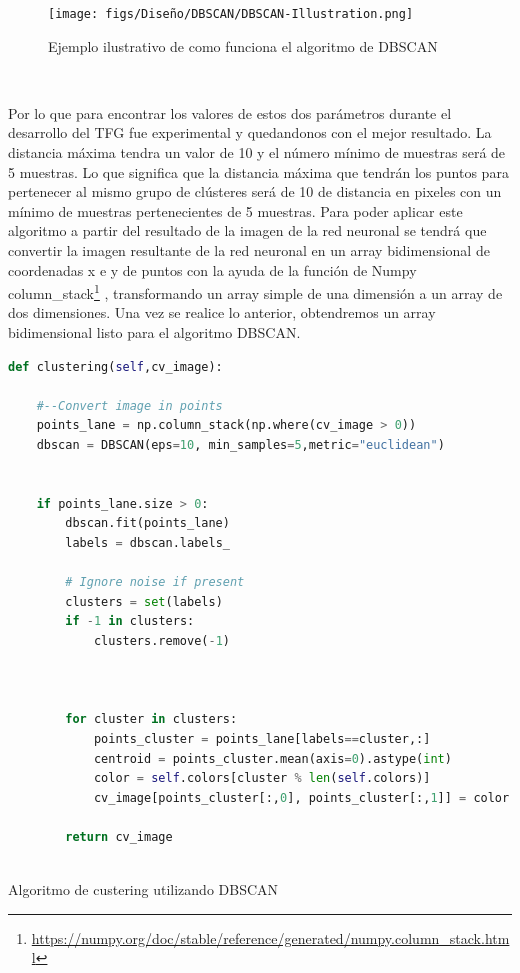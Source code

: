 \begin{figure} [H]
  \begin{center}
    \texttt{[image: figs/Diseño/DBSCAN/DBSCAN-Illustration.png]}
  \end{center}
  \caption{Ejemplo ilustrativo de como funciona el algoritmo de DBSCAN \cite{DBSCAN}}
  \label{fig:Ejemplo_DBSCAN}
\end{figure}\

Por lo que para encontrar los valores de estos dos parámetros durante el desarrollo del TFG fue experimental y quedandonos con el mejor resultado. La distancia máxima tendra un valor de 10 
y el número mínimo de muestras será de 5 muestras. Lo que significa que la distancia máxima que tendrán los puntos para pertenecer al mismo grupo de clústeres será de 10 de distancia en pixeles
con un mínimo de muestras pertenecientes de 5 muestras. Para poder aplicar este algoritmo a partir del resultado de la imagen de la red neuronal se tendrá que convertir la imagen resultante
de la red neuronal en un array bidimensional de coordenadas x e y de puntos con la ayuda de la función de Numpy column\_stack\footnote{\url{https://numpy.org/doc/stable/reference/generated/numpy.column_stack.html}} , 
transformando un array simple de una dimensión a un array de dos dimensiones. Una vez se realice lo anterior, obtendremos un array bidimensional listo para el algoritmo DBSCAN.\newline


\begin{code}[h]
  \begin{lstlisting}[language=Python]
    def clustering(self,cv_image):

    #--Convert image in points
    points_lane = np.column_stack(np.where(cv_image > 0))
    dbscan = DBSCAN(eps=10, min_samples=5,metric="euclidean")
    

    if points_lane.size > 0:
        dbscan.fit(points_lane)
        labels = dbscan.labels_

        # Ignore noise if present
        clusters = set(labels)
        if -1 in clusters:
            clusters.remove(-1)
      
      
            
        for cluster in clusters:
            points_cluster = points_lane[labels==cluster,:]
            centroid = points_cluster.mean(axis=0).astype(int)
            color = self.colors[cluster % len(self.colors)]
            cv_image[points_cluster[:,0], points_cluster[:,1]] = color

        return cv_image
  
  \end{lstlisting}
  \caption[Algoritmo de custering utilizando DBSCAN]{Algoritmo de custering utilizando DBSCAN}
  \label{cod:codejemplo}
  \end{code}  
  


